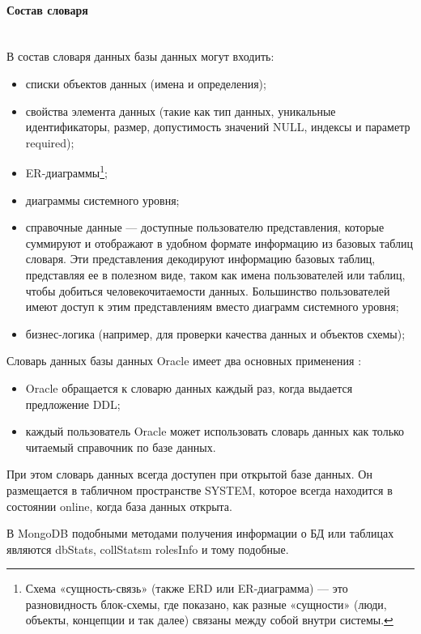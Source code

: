 \paragraph{Состав словаря} ~\\

В состав словаря данных базы данных могут входить: \autocite{DataDictionary}
\begin{itemize}
\item списки объектов данных (имена и определения);
\item свойства элемента данных (такие как тип данных, уникальные идентификаторы, размер, допустимость значений NULL, индексы и параметр required);
\item ER-диаграммы\footnote{Схема «сущность-связь» (также ERD или ER-диаграмма) — это разновидность блок-схемы, где показано, как разные «сущности» (люди, объекты, концепции и так далее) связаны между собой внутри системы.};
\item диаграммы системного уровня;
\item справочные данные — доступные пользователю представления, которые
суммируют и отображают в удобном формате информацию из базовых таблиц словаря. Эти представления декодируют информацию базовых таблиц, представляя ее в полезном виде, таком как имена пользователей или таблиц, чтобы добиться человекочитаемости данных. Большинство пользователей имеют доступ к этим представлениям вместо диаграмм системного уровня;
\item бизнес-логика (например, для проверки качества данных и объектов схемы);
\end{itemize}

Словарь данных базы данных Oracle имеет два основных применения \autocite{Kirillov2009}:
\begin{itemize}
\item Oracle обращается к словарю данных каждый раз, когда выдается предложение DDL;
\item каждый пользователь Oracle может использовать словарь данных как
только читаемый справочник по базе данных.
\end{itemize}

При этом словарь данных всегда доступен при открытой базе данных. Он размещается
в табличном пространстве SYSTEM, которое всегда находится в состоянии online,
когда база данных открыта.

В MongoDB подобными методами получения информации о БД или таблицах являются dbStats, collStatsm rolesInfo и тому подобные.\autocite{MongoDocsCommands}

